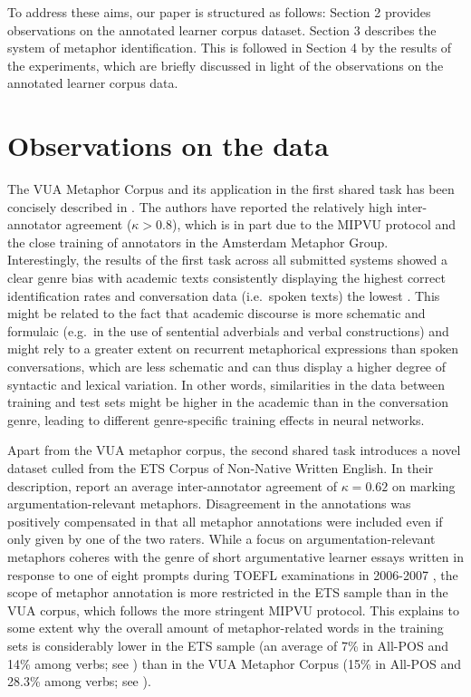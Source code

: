 \documentclass[11pt,a4paper]{article}
\begin{document}
To address these aims, our paper is structured as follows: Section 2 provides observations on the annotated learner corpus dataset. Section 3 describes the system of metaphor identification. This is followed in Section 4 by the results of the experiments, which are briefly discussed in light of the observations on the annotated learner corpus data. 


\section{Observations on the data}

The VUA Metaphor Corpus and its application in the first shared task has been concisely described in \citet{leong-EtAl:2018:PFLP}. The authors have reported the relatively high inter-annotator agreement ($\kappa>0.8$), which is in part due to the MIPVU protocol \citep{Steen2010} and the close training of annotators in the Amsterdam Metaphor Group. Interestingly, the results of the first task across all submitted systems showed a clear genre bias with academic texts consistently displaying the highest correct identification rates and conversation data (i.e.~spoken texts) the lowest \citet[p.60]{leong-EtAl:2018:PFLP}. This might be related to the fact that academic discourse is more schematic and formulaic (e.g.~in the use of sentential adverbials and verbal constructions) and might rely to a greater extent on recurrent metaphorical expressions than spoken conversations, which are less schematic and can thus display a higher degree of syntactic and lexical variation. In other words, similarities in the data between training and test sets might be higher in the academic than in the conversation genre, leading to different genre-specific training effects in neural networks.  

Apart from the VUA metaphor corpus, the second shared task introduces a novel dataset culled from the ETS Corpus of Non-Native Written English. In their description, \citet{beigmanklebanov-EtAl:2018} report an average inter-annotator agreement of $\kappa=0.62$ on marking argumentation-relevant metaphors. Disagreement in the annotations was positively compensated in that all metaphor annotations were included even if only given by one of the two raters. While a focus on argumentation-relevant metaphors coheres with the genre of short argumentative learner essays written in response to one of eight prompts during TOEFL examinations in 2006-2007 \citep{Blanchard-EtAl:TOEFL11}, the scope of metaphor annotation is more restricted in the ETS sample than in the VUA corpus, which follows the more stringent MIPVU protocol. This explains to some extent why the overall amount of metaphor-related words in the training sets is considerably lower in the ETS sample (an average of 7\% in All-POS and 14\% among verbs; see \citealp[p.88]{beigmanklebanov-EtAl:2018}) than in the VUA Metaphor Corpus (15\% in All-POS and 28.3\% among verbs; see \citealp[p.58]{leong-EtAl:2018:PFLP}). 
\end{document}
